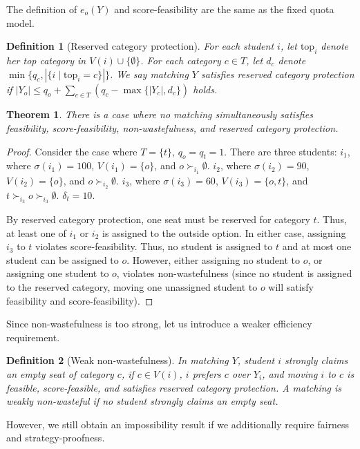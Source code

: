 \documentclass{article}
\newtheorem{theorem}{Theorem}
\newtheorem{definition}{Definition}
\begin{document}
The definition of $e_o(Y)$ and score-feasibility are the same 
as the fixed quota model. 

\begin{definition}[Reserved category protection]
For each student $i$, let $\text{top}_i$ denote her top category in $V(i) \cup \{\emptyset\}$.
For each category $c\in T$, let $d_c$ denote $\min{\{q_c, |\{i \mid \text{top}_i =c\}|\}}$.
We say matching $Y$ satisfies reserved category protection 
if $|Y_o|\leq q_o + \sum_{c \in T} (q_c - \max\{|Y_c|, d_c\})$ holds. 
\end{definition}

\begin{theorem}
There is a case where no matching 
simultaneously satisfies feasibility, score-feasibility, non-wastefulness, and
reserved category protection.
\end{theorem}
\begin{proof}
Consider the case where $T=\{t\}$, $q_o=q_t=1$. 
There are three students: $i_1$, where $\sigma(i_1)=100$, 
$V(i_1)=\{o\}$, and $o\succ_{i_1} \emptyset$.
$i_2$, where $\sigma(i_2)=90$, 
$V(i_2)=\{o\}$, and $o\succ_{i_2} \emptyset$.
$i_3$, where $\sigma(i_3)=60$, 
$V(i_3)=\{o, t\}$, and 
$t \succ_{i_3} o \succ_{i_3} \emptyset$. 
$\delta_t=10$. 

By reserved category protection, one seat must be reserved for category $t$. 
Thus, at least one of $i_1$ or $i_2$ is assigned to the outside option. 
In either case, 
assigning $i_3$ to $t$ violates score-feasibility. 
Thus, no student is assigned to $t$ and at most one student can be assigned to $o$. 
However, either assigning no student to $o$, or assigning one student to $o$, violates
non-wastefulness (since no student is assigned to the reserved category, moving one unassigned 
student to $o$ will satisfy feasibility and score-feasibility). 
\end{proof}

Since non-wastefulness is too strong, let us introduce a weaker efficiency requirement.
    \begin{definition}[Weak non-wastefulness]
In matching $Y$, student $i$ strongly claims an empty seat of category $c$,
if $c \in V(i)$, $i$ prefers $c$ over $Y_i$, 
and moving $i$ to $c$ is feasible, score-feasible, and satisfies reserved category protection.
A matching is weakly non-wasteful if no student strongly claims an empty seat.
\end{definition}

However, we still obtain an impossibility result if we additionally require fairness and 
strategy-proofness. 
\end{document}
